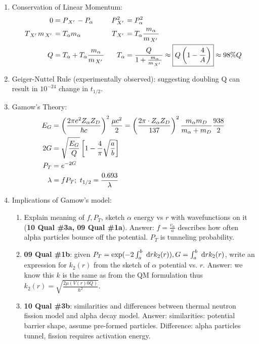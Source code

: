 \documentclass{school-22.101-notes}
\begin{document}
\begin{enumerate}
\item Conservation of Linear Momentum:
\begin{align}
0 &= P_{\left.X^{\prime}\right.} - P_{\alpha}  & P_{\left.X^{\prime}\right.}^2 &= P_{\alpha}^2 \\
T_{\left.X^{\prime}\right.} m_{\left.X^{\prime}\right.} &= T_{\alpha} m_{\alpha}  & T_{\left.X^{\prime}\right.} &= T_{\alpha} \frac{m_{\alpha}}{m_{\left.X^{\prime}\right.}} \\
Q &= T_{\alpha} + T_{\alpha} \frac{m_{\alpha}}{m_{\left.X^{\prime}\right.}}  & T_{\alpha} &= \frac{Q}{1 + \frac{m_{\alpha}}{m_{\left.X^{\prime}\right.}}}  \approx \boxed{ Q \left( 1 - \frac{4}{A} \right) } \approx 98\% Q
\end{align}
\item Geiger-Nuttel Rule (experimentally observed): suggesting doubling Q can result in $10^{-24}$ change in $t_{1/2}$.
\item Gamow's Theory:
    \begin{align}
    E_G &= \left(\frac{2 \pi e^2 Z_{\alpha} Z_D}{\hbar c}\right)^2 \frac{\mu c^2}{2} = \left( \frac{2 \pi \cdot Z_{\alpha} Z_D}{137} \right)^2 \frac{m_{\alpha} m_D}{m_{\alpha} + m_D} \frac{938}{2} \\
    2G &= \sqrt{\frac{E_G}{Q}} \left[ 1 - \frac{4}{\pi} \sqrt{\frac{a}{b}} \right] \\
    P_T &= e^{-2G} \\
    \lambda &= f P_T; \mbox{ } t_{1/2} = \frac{0.693}{\lambda} 
    \end{align}
\item Implications of Gamow's model:
\begin{enumerate}
\item Explain meaning of $f, P_T$, sketch $\alpha$ energy vs $r$ with wavefunctions on it (\textbf{10 Qual \#3a, 09 Qual \#1a}). Answer: $f = \frac{v_{\alpha}}{a}$ describes how often alpha particles bounce off the potential. $P_T$ is tunneling probability. 

\item \textbf{09 Qual \#1b}: given $P_T = \exp (- 2 \int_a^b \mbox{ }\mathrm{d} r k_2(r)), G = \int_a^b \mbox{ }\mathrm{d} r k_2 (r)$, write an expression for $k_2(r)$ from the sketch of $\alpha$ potential vs. $r$. Answer: we know this $k$ is the same as from the QM formulation thus $\displaystyle k_2 (r) = \sqrt{ \frac{2 \mu (V(r) 0 Q)}{\hbar^2}}$. 

\item \textbf{10 Qual \#3b}: similarities and differences between thermal neutron fission model and alpha decay model. Answer: similarities: potential barrier shape, assume pre-formed particles. Difference: alpha particles tunnel, fission requires activation energy. 


\end{enumerate}
\end{enumerate}
\end{document}
